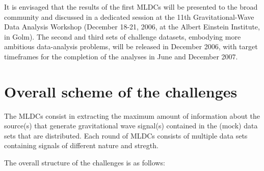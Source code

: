 \documentclass[11pt]{report}
\begin{document}
It is envisaged that the results of the first MLDCs will be presented to the broad community and discussed in a dedicated session at the 11th Gravitational-Wave Data Analysis Workshop (December 18-21, 2006, at the Albert Einstein Institute, in Golm). The second and third sets of challenge datasets, embodying more ambitious data-analysis problems, will be released in December 2006, with target timeframes for the completion of the analyses in June and December 2007. 

\section{Overall scheme of the challenges}

The MLDCs consist in extracting the maximum amount of information about the source(s) that generate gravitational wave signal(s) contained in the (mock) data sets that are distributed. Each round of MLDCs consists of multiple data sets containing signals of different nature and stregth.

The overall structure of the challenges is as follows:
\end{document}
